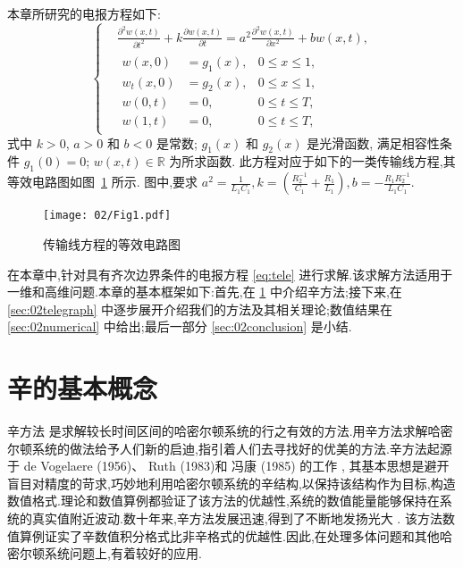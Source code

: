 本章所研究的电报方程如下:
\begin{equation}\label{eq:tele}
\left\lbrace
\begin{aligned}
&\frac{\partial ^2 w(x,t)}{\partial t^2}+k\frac{\partial w(x,t)}{\partial t}=a^2 \frac{\partial ^2 w(x,t)}{\partial x^2} + b w(x,t),\\
&\begin{aligned}
w(x,0)&=g_1(x),&0 \le x \le 1,\\
w_t(x,0)&=g_2(x),&0 \le x \le 1,\\
w(0,t)&=0,&0 \le t \le T,\\
w(1,t)&=0,&0 \le t \le T,
\end{aligned}
\end{aligned}
\right.
\end{equation}
式中 $k > 0$, $a>0$ 和 $b < 0$ 是常数; $g_1(x)$ 和 $g_2(x)$ 是光滑函数, 满足相容性条件 $g_1(0)=0$; $w(x,t) \in \mathbb{R}$ 为所求函数. 此方程对应于如下的一类传输线方程,其等效电路图如图~\ref{fig:tele1} 所示. 图中,要求 $a^2 = \frac{1}{L_1C_1}, k= (\frac{R_2^{-1}}{C_1}+\frac{R_1}{L_1}), b =-\frac{R_1R_2^{-1}}{L_1C_1}$.
\begin{figure}[h]
    \centering
    \texttt{[image: 02/Fig1.pdf]}
    \caption{传输线方程的等效电路图}
    \label{fig:tele1}
\end{figure}

在本章中,针对具有齐次边界条件的电报方程 \eqref{eq:tele} 进行求解.该求解方法适用于一维和高维问题.本章的基本框架如下:首先,在 \ref{sec:02symplectic} 中介绍辛方法;接下来,在 \ref{sec:02telegraph} 中逐步展开介绍我们的方法及其相关理论;数值结果在 \ref{sec:02numerical} 中给出;最后一部分 \ref{sec:02conclusion} 是小结.

\section{辛的基本概念}\label{sec:02symplectic}
辛方法 \cite{feng2010symplectic} 是求解较长时间区间的哈密尔顿系统的行之有效的方法.用辛方法求解哈密尔顿系统的做法给予人们新的启迪,指引着人们去寻找好的优美的方法.辛方法起源于 de Vogelaere (1956)、 Ruth (1983)和 冯康 (1985) 的工作 \cite{hairer2006geometric}, 其基本思想是避开盲目对精度的苛求,巧妙地利用哈密尔顿系统的辛结构,以保持该结构作为目标,构造数值格式.理论和数值算例都验证了该方法的优越性,系统的数值能量能够保持在系统的真实值附近波动.数十年来,辛方法发展迅速,得到了不断地发扬光大 \cite{calvo1994numerical,leimkuhler2004simulating,hong2006multi,yang2009extended,monovasilis2013exponentially,xin2016birkhoffian,michalas2016numerical,liao2016multi}. 该方法数值算例证实了辛数值积分格式比非辛格式的优越性.因此,在处理多体问题和其他哈密尔顿系统问题上,有着较好的应用.

